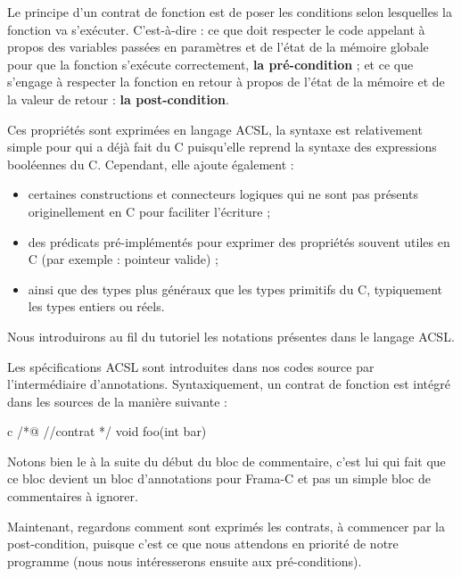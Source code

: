 \documentclass[middle]{zmdocument}
\begin{document}


Le principe d'un contrat de fonction est de poser les conditions selon 
lesquelles la fonction va s'exécuter. C'est-à-dire : ce que doit respecter 
le code appelant à propos des variables passées en paramètres et de l'état de
la mémoire globale pour que la fonction s'exécute correctement, 
\textbf{la pré-condition} ; et ce que s'engage à respecter la fonction en retour
à propos de l'état de la mémoire et de la valeur de retour : 
\textbf{la post-condition}.



Ces propriétés sont exprimées en langage ACSL, la syntaxe est relativement 
simple pour qui a déjà fait du C puisqu'elle reprend la syntaxe des expressions
booléennes du C. Cependant, elle ajoute également :



\begin{itemize}
\item certaines constructions et connecteurs logiques qui ne sont pas présents 
originellement en C pour faciliter l'écriture ;
\item des prédicats pré-implémentés pour exprimer des propriétés souvent utiles 
en C (par exemple : pointeur valide) ;
\item ainsi que des types plus généraux que les types primitifs du C, 
typiquement les types entiers ou réels.
\end{itemize}


Nous introduirons au fil du tutoriel les notations présentes dans le 
langage ACSL.



Les spécifications ACSL sont introduites dans nos codes source par 
l'intermédiaire d'annotations. Syntaxiquement, un contrat de fonction est 
intégré dans les sources de la manière suivante :



\begin{CodeBlock}{c}
/*@
  //contrat
*/
void foo(int bar){

}
\end{CodeBlock}



Notons bien le  à la suite du début du bloc de commentaire, c'est lui qui 
fait que ce bloc devient un bloc d'annotations pour Frama-C et pas un simple 
bloc de commentaires à ignorer.



Maintenant, regardons comment sont exprimés les contrats, à commencer par la
post-condition, puisque c'est ce que nous attendons en priorité de notre 
programme (nous nous intéresserons ensuite aux pré-conditions).
\end{document}
